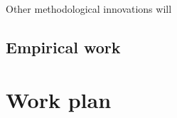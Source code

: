 \documentclass[a4paper,12pt]{article}
\begin{document}
Other methodological innovations will 

\subsection{Empirical work}




\section{Work plan}
\end{document}
